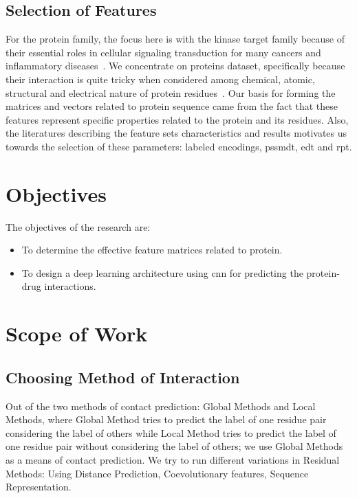 \subsection{Selection of Features}

For the protein family, the focus here is with the kinase target family because of their essential roles in cellular signaling transduction for many cancers and inflammatory diseases~\citep{Tang2013,Kanehisa2000}. We concentrate on proteins dataset, specifically because their interaction is quite tricky when considered among chemical, atomic, structural and electrical nature of protein residues~\citep{Mathai2019}. Our basis for forming the matrices and vectors related to protein sequence came from the fact that these features represent specific properties related to the protein and its residues. Also, the literatures describing the feature sets characteristics and results motivates us towards the selection of these parameters: labeled encodings, \acrshort{pssmdt}, \acrshort{edt} and \acrshort{rpt}.


\section{Objectives}
The objectives of the research are:
\begin{itemize}
    \setlength\parindent{36pt}
    \item To determine the effective feature matrices related to protein.
    \item To design a deep learning architecture using \acrfull{cnn} for predicting the protein-drug interactions.
\end{itemize}

\section{Scope of Work}


\subsection{Choosing Method of Interaction}
Out of the two methods of contact prediction: Global Methods and Local Methods, where Global Method tries to predict the label of one residue pair considering the label of others while Local Method tries to predict the label of one residue pair without considering the label of others; we use Global Methods as a means of contact prediction. We try to run different variations in Residual Methods: Using Distance Prediction, Coevolutionary features, Sequence Representation. 


